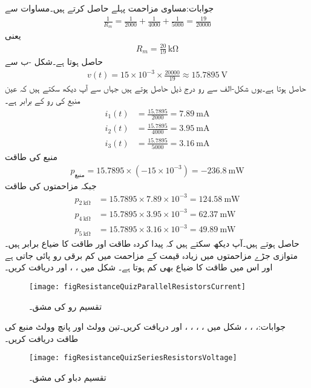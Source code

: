 جوابات:مساوی مزاحمت پہلے حاصل کرتے ہیں۔مساوات  سے
\begin{align*}
\frac{1}{R_m}=\frac{1}{2000}+\frac{1}{4000}+\frac{1}{5000}=\frac{19}{20000}
\end{align*}
یعنی
\begin{align*}
R_m=\frac{20}{19} \, \si{\kilo\ohm}
\end{align*}
حاصل ہوتا ہے۔شکل -ب سے 
\begin{align*}
v(t)=15 \times 10^{-3} \times \frac{20000}{19} \approx \SI{15.7895}{\volt}
\end{align*}
حاصل ہوتا ہے۔یوں شکل-الف سے رو درج ذیل حاصل ہوتے ہیں جہاں سے آپ دیکھ سکتے ہیں کہ  عین منبع کی رو کے برابر ہے۔
\begin{align*}
i_1(t)&=\frac{15.7895}{2000}=\SI{7.89}{\milli\ampere}\\
i_2(t)&=\frac{15.7895}{4000}=\SI{3.95}{\milli\ampere}\\
i_3(t)&=\frac{15.7895}{5000}=\SI{3.16}{\milli\ampere}
\end{align*}
منبع کی طاقت
\begin{align*}
p_{\text{منبع}}=15.7895 \times (-15\times 10^{-3})=\SI{-236.8}{\milli\watt}
\end{align*}
جبکہ مزاحمتوں کی طاقت
\begin{align*}
p_{\SI{2}{\kilo\ohm}}&=15.7895\times 7.89\times 10^{-3}=\SI{124.58}{\milli\watt}\\
p_{\SI{4}{\kilo\ohm}}&=15.7895\times 3.95\times 10^{-3}=\SI{62.37}{\milli\watt}\\
p_{\SI{5}{\kilo\ohm}}&=15.7895\times 3.16\times 10^{-3}=\SI{49.89}{\milli\watt}
\end{align*}
حاصل ہوتے ہیں۔آپ دیکھ سکتے ہیں کہ پیدا کردہ طاقت اور طاقت کا ضیاع برابر ہیں۔متوازی جڑے مزاحمتوں میں زیادہ قیمت کے مزاحمت میں کم برقی رو پائی جاتی ہے اور اس میں طاقت کا ضیاع بھی کم ہوتا ہے۔
\FloatBarrier
شکل  میں ، ،  اور  دریافت کریں۔
\begin{figure}
\centering
\texttt{[image: figResistanceQuizParallelResistorsCurrent]}
\caption{تقسیم رو کی مشق۔}
\label{مشق_مزاحمتی_تقسیم_رو_مشق}
\end{figure}

جوابات:، ، ، 
\FloatBarrier
شکل  میں ، ، ، ،  اور  دریافت کریں۔تین وولٹ اور پانچ وولٹ منبع کی طاقت دریافت کریں۔
\begin{figure}
\centering
\texttt{[image: figResistanceQuizSeriesResistorsVoltage]}
\caption{تقسیم دباو کی مشق۔}
\label{مشق_مزاحمتی_تقسیم_دباو_مشق}
\end{figure}

